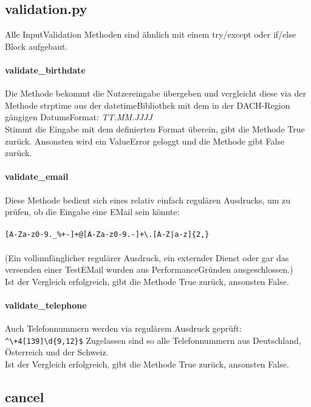         \subsection{validation.py}
            Alle Input\-Validation Methoden sind ähnlich mit einem try/except oder if/else Block aufgebaut.

            \paragraph{validate\_birthdate}
                Die Methode bekommt die Nutzereingabe übergeben und vergleicht diese via der Methode strptime aus der datetime\-Bibliothek \cite{datetime} mit dem in der DACH-Region gängigen Datums\-Format: \emph{TT.MM.JJJJ} \\
                Stimmt die Eingabe mit dem definierten Format überein, gibt die Methode True zurück. Ansonsten wird ein ValueError geloggt und die Methode gibt False zurück.

            \paragraph{validate\_email}
                Diese Methode bedient sich eines relativ einfach regulären Ausdrucks, um zu prüfen, ob die Eingabe eine E\-Mail sein könnte: \\
                \\
                \verb/[A-Za-z0-9._%+-]+@[A-Za-z0-9.-]+\.[A-Z|a-z]{2,}/ \\ 
                \\
                (Ein vollumfänglicher regulärer Ausdruck, ein externder Dienst oder gar das versenden einer Test\-E\-Mail wurden aus Performance\-Gründen ausgeschlossen.)\\
                Ist der Vergleich erfolgreich, gibt die Methode True zurück, ansonsten False.

            \paragraph{validate\_telephone}
                Auch Telefonnummern werden via regulärem Ausdruck geprüft: \verb/^\+4[139]\d{9,12}$/
                Zugelassen sind so alle Telefonnummern aus Deutschland, Österreich und der Schweiz.\\
                Ist der Vergleich erfolgreich, gibt die Methode True zurück, ansonsten False.

        
        \subsection{cancel}
